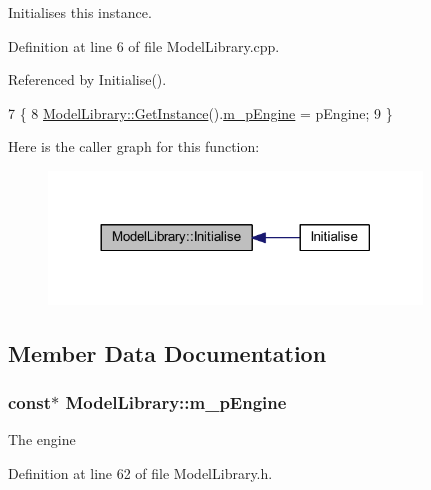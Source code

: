 Initialises this instance. 



Definition at line 6 of file Model\+Library.\+cpp.



Referenced by Initialise().


\begin{DoxyCode}
7 \{
8   \hyperlink{class_singleton_a74f32751d99bf3cc95fe17aba11f4b07}{ModelLibrary::GetInstance}().\hyperlink{class_model_library_aa49436037315f3a3732bb3a0a855b243}{m\_pEngine} = pEngine;
9 \}
\end{DoxyCode}


Here is the caller graph for this function\+:\nopagebreak
\begin{figure}[H]
\begin{center}
\leavevmode
\includegraphics[width=281pt]{class_model_library_a85d5aeaa54615a41c0f38f638606fe41_icgraph}
\end{center}
\end{figure}




\subsection{Member Data Documentation}
\subsubsection[{\texorpdfstring{m\+\_\+p\+Engine}{m_pEngine}}]{ const$\ast$ Model\+Library\+::m\+\_\+p\+Engine\hspace{0.3cm}{\ttfamily [private]}}\hypertarget{class_model_library_aa49436037315f3a3732bb3a0a855b243}{}\label{class_model_library_aa49436037315f3a3732bb3a0a855b243}


The engine 



Definition at line 62 of file Model\+Library.\+h.




